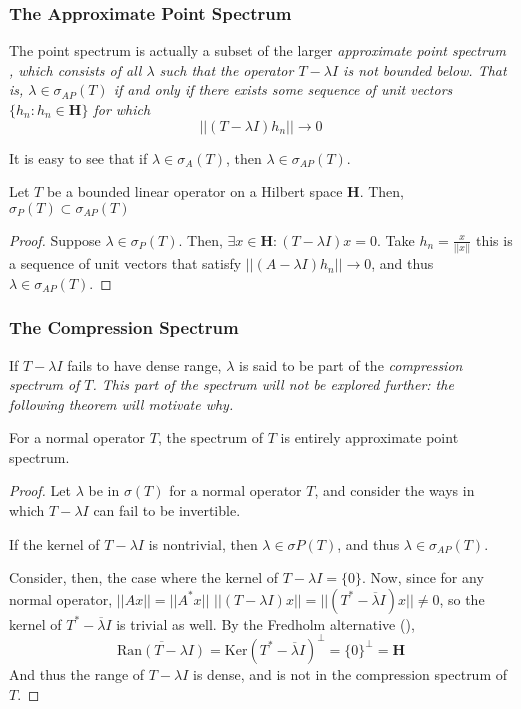 \subsubsection{The Approximate Point Spectrum}
The point spectrum is actually a subset of the larger \em approximate point
spectrum \em, which consists of all $\lambda$ such that the operator $T-\lambda
I$ is not bounded below. That is, $\lambda \in \sigma_{AP}(T)$ if and only if
there exists some sequence of unit vectors $\{h_n: h_n \in \textbf{H}\}$ for
which
\[
    ||(T-\lambda I)h_n|| \to 0
\]

It is easy to see that if $\lambda\in\sigma_A(T)$, then
$\lambda\in\sigma_{AP}(T)$.
\begin{theorem}
    Let $T$ be a bounded linear operator on a Hilbert space $\textbf{H}$. Then,
    $\sigma_P(T) \subset \sigma_{AP}(T)$
\end{theorem}
\begin{proof}
    Suppose $\lambda\in\sigma_P(T)$. Then, 
    $\exists x\in\textbf{H} : (T-\lambda I)x = 0$. Take $h_n = \frac{x}{||x||}$
    this is a sequence of unit vectors that satisfy $||(A-\lambda I)h_n||\to 0$,
    and thus $\lambda\in\sigma_{AP}(T)$.
\end{proof}

\subsubsection{The Compression Spectrum}
If $T-\lambda I$ fails to have dense range, $\lambda$ is said to be part of the
\em compression spectrum \em of $T$. This part of the spectrum will not be
explored further: the following theorem will motivate why.
\begin{theorem}
    For a normal operator $T$, the spectrum of $T$ is entirely approximate point
    spectrum.
\end{theorem}
\begin{proof}
    Let $\lambda$ be in $\sigma(T)$ for a normal operator $T$, and consider the
    ways in which $T-\lambda I$ can fail to be invertible.

    If the kernel of $T-\lambda I$ is nontrivial, then $\lambda\in\sigma{P}(T)$,
    and thus $\lambda\in\sigma_{AP}(T)$.

    Consider, then, the case where the kernel of $T-\lambda I = \{0\}$. Now,
    since for any normal operator, $||Ax|| = ||A^*x||$ %
    $||(T-\lambda I)x|| = ||(T^* - \overline{\lambda}I)x|| \not= 0$, so the
    kernel of $T^* - \overline{\lambda}I$ is trivial as well.
    By the Fredholm alternative (\cite[p. 350]{Olver2014}),
    \[
        \overline{\text{Ran}(T-\lambda I)} = \text{Ker}(T^* -
        \overline{\lambda}I)^{\perp} = \{0\}^{\perp} = \textbf{H}
        \]
    And thus the range of $T-\lambda I$ is dense, and is not in the compression
    spectrum of $T$.
\end{proof}

